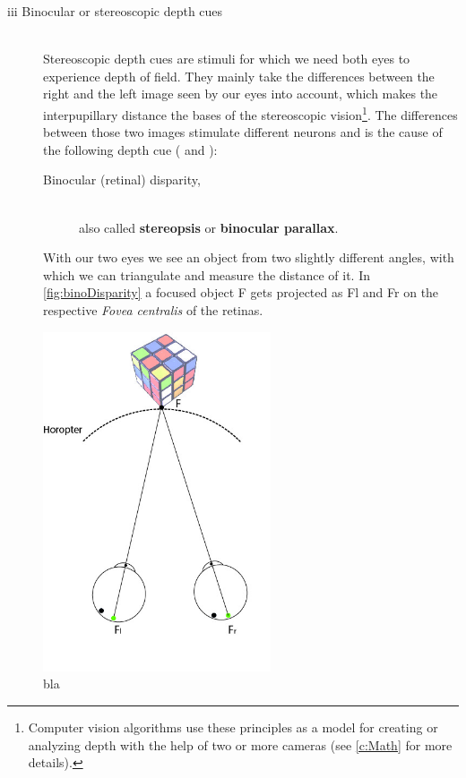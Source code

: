 \begin{description}
\item [iii Binocular or stereoscopic depth cues]\hfill \\ Stereoscopic depth cues are stimuli for which we need both eyes to experience depth of field. They mainly take the differences between the right and the left image seen by our eyes into account, which makes the  interpupillary distance the bases of the stereoscopic vision\footnote{Computer vision algorithms use these principles as a model for creating or analyzing depth with the help of two or more cameras (see \autoref{c:Math} for more details).}. The differences between those two images stimulate different neurons and is the cause of the following depth cue (\cite[p.232 et seqq.]{Goldstein.2015} and \cite[p.36 et seqq.]{Hottong.2009}): 
	\begin{description}
	\item [Binocular (retinal) disparity,]\hfill \\ also called \textbf{stereopsis} or \textbf{binocular parallax}.
	\end{description}
With our two eyes we see an object from two slightly different angles, with which we can triangulate and measure the distance of it.  In \autoref{fig:binoDisparity} a focused object F gets projected as Fl and Fr on the respective \textit{Fovea centralis} of the retinas.
   
\end{description} 

\begin{figure}[htbp]
		\centering
		\includegraphics[width=0.6\textwidth]{figures/Disparity}
		\caption[bla]{bla}
		\label{fig:binoDisparity}
\end{figure}



